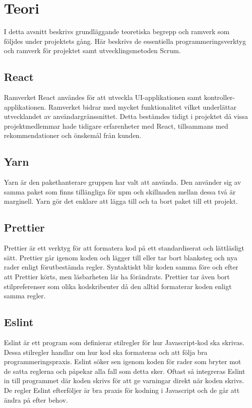 \chapter{Teori}
\label{cha:theory}
I detta avsnitt beskrivs grundläggande teoretiska begrepp och ramverk som följdes under projektets gång. Här beskrivs de essentiella programmeringsverktyg och ramverk för projektet samt utvecklingsmetoden Scrum.

\section{React}
Ramverket React användes för att utveckla UI-applikationen samt kontroller-applikationen.\cite{React} Ramverket bidrar med mycket funktionalitet vilket underlättar utvecklandet av användargränssnittet.  Detta bestämdes tidigt i projektet då vissa projektmedlemmar hade tidigare erfarenheter med React, tillsammans med rekommendationer och önskemål från kunden.

\section{Yarn}
Yarn är den pakethanterare gruppen har valt att använda.\cite{Yarn} Den använder sig av samma paket som finns tillängliga för npm och skillnaden mellan dessa två är marginell. Yarn gör det enklare att lägga till och ta bort paket till ett projekt.

\section{Prettier}
Prettier är ett verktyg för att formatera kod på ett standardiserat och lättläsligt sätt.\cite{prettier} Prettier går igenom koden och lägger till eller tar bort blanksteg och nya rader enligt förutbestämda regler. Syntaktiskt blir koden samma före och efter att Prettier körts, men läsbarheten lär ha förändrats. Prettier tar även bort stilpreferenser som olika kodskribenter då den alltid formaterar koden enligt samma regler.


\section{Eslint}
Eslint är ett program som definierar stilregler för hur Javascript-kod ska skrivas.\cite{eslint} Dessa stilregler handlar om hur kod ska formateras och att följa bra programmeringspraxis. Eslint söker sen igenom koden för rader som bryter mot de satta reglerna och påpekar alla fall som detta sker. Oftast så integreras Eslint in till programmet där koden skrivs för att ge varningar direkt när koden skrivs. De regler Eslint efterföljer är bra praxis för kodning i Javascript och de går att ändra på efter behov.


